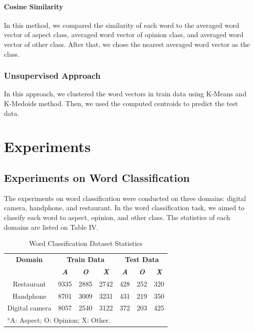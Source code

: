 \documentclass[a4paper,conference]{IEEEtran}
\begin{document}
\paragraph{Cosine Similarity}
In this method, we compared the similarity of each word to the averaged word vector of aspect class, averaged word vector of opinion class, and averaged word vector of other class. After that, we chose the nearest averaged word vector as the class.

\subsubsection{Unsupervised Approach}
In this approach, we clustered the word vectors in train data using K-Means and K-Medoids method. Then, we used the computed centroids to predict the test data.

\section{Experiments}

\subsection{Experiments on Word Classification}
The experiments on word classification were conducted on three domains: digital camera, handphone, and restaurant. In the word classification task, we aimed to classify each word to aspect, opinion, and other class. The statistics of each domains are listed on Table IV.

\begin{table}[htbp]
\caption{Word Classification Dataset Statistics}
\begin{center}
\begin{tabular}{|c|c|c|c|c|c|c|}
\hline
\textbf{Domain}&\multicolumn{3}{|c|}{\textbf{Train Data}}&\multicolumn{3}{|c|}{\textbf{Test Data}}\\
\cline{2-7}
 & \textbf{\textit{A}}& \textbf{\textit{O}}&\textbf{\textit{X}}& \textbf{\textit{A}}&\textbf{\textit{O}}& \textbf{\textit{X}}\\
\hline
Restaurant&9335&2885&2742&428&252&320 \\
\hline
Handphone&8701&3009&3231&431&219&350 \\
\hline
Digital camera&8057&2540&3122&372&203&425 \\
\hline
\multicolumn{7}{l}{$^{\mathrm{a}}$A: Aspect; O: Opinion; X: Other.}\\
\end{tabular}
\label{tab4}
\end{center}
\end{table}
\end{document}
